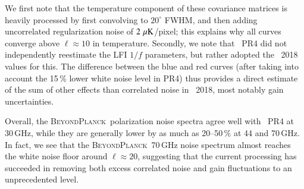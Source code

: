 \documentclass[twocolumn]{aa}
\newcommand{\BP}{\textsc{BeyondPlanck}}
\begin{document}
We first note that the temperature component of these covariance
matrices is heavily processed by first convolving to $20^{\circ}$
FWHM, and then adding uncorrelated regularization noise of
$2\,\muK$/pixel; this explains why all curves converge above
$\ell\approx10$ in temperature. Secondly, we note that \Planck\ PR4
did not independently reestimate the LFI $1/f$ parameters, but rather
adopted the \Planck\ 2018 values for this. The difference between the
blue and red curves (after taking into account the 15\,\% lower white
noise level in PR4) thus provides a direct estimate of the sum of other
effects than correlated noise in \Planck\ 2018, most notably gain
uncertainties.

Overall, the \BP\ polarization noise spectra agree well with
\Planck\ PR4 at 30\,GHz, while they are generally lower by as much as
20--50\,\% at 44 and 70\,GHz. In fact, we see that the \BP\ 70\,GHz
noise spectrum almost reaches the white noise floor around
$\ell\approx 20$, suggesting that the current processing has succeeded
in removing both excess correlated noise and gain fluctuations to an
unprecedented level. 


\end{document}
